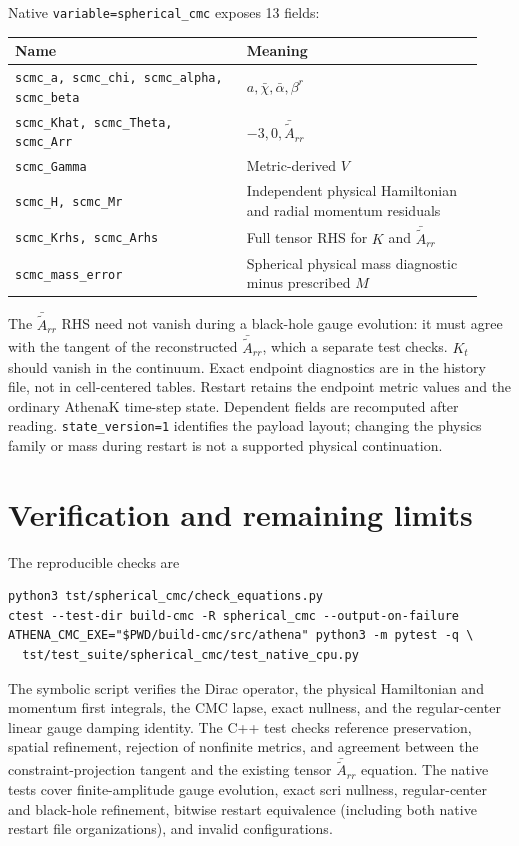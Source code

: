 \documentclass[11pt]{article}
\newcommand{\bc}{\bar\chi}
\newcommand{\ba}{\bar\alpha}
\newcommand{\Ac}{\bar{\tilde A}}
\begin{document}
Native \texttt{variable=spherical\_cmc} exposes 13 fields:
\begin{center}
\begin{tabular}{p{0.46\linewidth}p{0.47\linewidth}}
\toprule Name & Meaning\\\midrule
\texttt{scmc\_a, scmc\_chi, scmc\_alpha, scmc\_beta} & $a,\bc,\ba,\beta^r$\\
\texttt{scmc\_Khat, scmc\_Theta, scmc\_Arr} & $-3,0,\Ac_{rr}$\\
\texttt{scmc\_Gamma} & Metric-derived $V$\\
\texttt{scmc\_H, scmc\_Mr} & Independent physical Hamiltonian and radial momentum residuals\\
\texttt{scmc\_Krhs, scmc\_Arhs} & Full tensor RHS for $K$ and $\Ac_{rr}$\\
\texttt{scmc\_mass\_error} & Spherical physical mass diagnostic minus prescribed $M$\\\bottomrule
\end{tabular}
\end{center}
The $\Ac_{rr}$ RHS need not vanish during a black-hole gauge evolution: it must
agree with the tangent of the reconstructed $\Ac_{rr}$, which a separate test
checks. $K_t$ should vanish in the continuum. Exact endpoint diagnostics are in
the history file, not in cell-centered tables. Restart retains the endpoint
metric values and the ordinary AthenaK time-step state. Dependent fields are
recomputed after reading. \texttt{state\_version=1} identifies the payload layout;
changing the physics family or mass during restart is not a supported physical
continuation.

\section{Verification and remaining limits}
The reproducible checks are
\begin{lstlisting}
python3 tst/spherical_cmc/check_equations.py
ctest --test-dir build-cmc -R spherical_cmc --output-on-failure
ATHENA_CMC_EXE="$PWD/build-cmc/src/athena" python3 -m pytest -q \
  tst/test_suite/spherical_cmc/test_native_cpu.py
\end{lstlisting}
The symbolic script verifies the Dirac operator, the physical Hamiltonian and
momentum first integrals, the CMC lapse, exact nullness, and the regular-center
linear gauge damping identity. The C++ test checks reference preservation,
spatial refinement, rejection of nonfinite metrics, and agreement between the
constraint-projection tangent and the existing tensor $\Ac_{rr}$ equation.
The native tests cover finite-amplitude gauge evolution, exact scri nullness,
regular-center and black-hole refinement, bitwise restart equivalence (including
both native restart file organizations), and invalid configurations.
\end{document}
